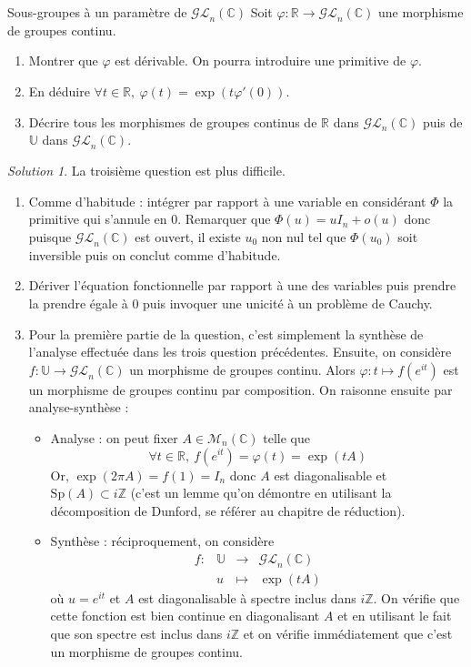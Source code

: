 \documentclass[french]{book}
\newcommand{\Z}{\mathbb{Z}}
\newcommand{\R}{\mathbb{R}}
\newcommand{\C}{\mathbb{C}}
\newcommand{\U}{\mathbb{U}}
\theoremstyle{definition}
\theoremstyle{remark}
\newtheorem*{sol}{Solution}
\begin{document}
\begin{exo}[2]{Sous-groupes à un paramètre de $\mathcal{GL}_n(\C)$}
	Soit $\varphi:\R\to\mathcal{GL}_n(\C)$ une morphisme de groupes continu.
	\begin{enumerate}
		\item Montrer que $\varphi$ est dérivable. On pourra introduire une primitive de $\varphi$.
		\item En déduire $\forall t\in\R,\ \varphi(t)=\exp(t\varphi'(0))$.
		\item Décrire tous les morphismes de groupes continus de $\R$ dans $\mathcal{GL}_n(\C)$ puis de $\U$ dans $\mathcal{GL}_n(\C)$.
	\end{enumerate}
\end{exo}
\begin{sol}
	La troisième question est plus difficile.
	\begin{enumerate}
		\item Comme d'habitude : intégrer par rapport à une variable en considérant $\Phi$ la primitive qui s'annule en $0$. Remarquer que $\Phi(u)=uI_n+o(u)$ donc puisque $\mathcal{GL}_n(\C)$ est ouvert, il existe $u_0$ non nul tel que $\Phi(u_0)$ soit inversible puis on conclut comme d'habitude.
		\item Dériver l'équation fonctionnelle par rapport à une des variables puis prendre la prendre égale à $0$ puis invoquer une unicité à un problème de Cauchy.
		\item Pour la première partie de la question, c'est simplement la synthèse de l'analyse effectuée dans les trois question précédentes. Ensuite, on considère $f:\U\to\mathcal{GL}_n(\C)$ un morphisme de groupes continu. Alors $\varphi:t\mapsto f(e^{it})$ est un morphisme de groupes continu par composition. On raisonne ensuite par analyse-synthèse :
		\begin{itemize}
			\item Analyse : on peut fixer $A\in\mathcal{M}_n(\C)$ telle que $$\forall t\in\R,\ f(e^{it})=\varphi(t)=\exp(tA)$$ Or, $\exp(2\pi A)=f(1)=I_n$ donc $A$ est diagonalisable et $\text{Sp}(A)\subset i\Z$ (c'est un lemme qu'on démontre en utilisant la décomposition de Dunford, se référer au chapitre de réduction).
			\item Synthèse : réciproquement, on considère $$\begin{array}{lrcl}
				f:&\U&\longrightarrow&\mathcal{GL}_n(\C)\\
				&u&\longmapsto&\exp(tA)
			\end{array}$$ où $u=e^{it}$ et $A$ est diagonalisable à spectre inclus dans $i\Z$. On vérifie que cette fonction est bien continue en diagonalisant $A$ et en utilisant le fait que son spectre est inclus dans $i\Z$ et on vérifie immédiatement que c'est un morphisme de groupes continu.
		\end{itemize}
	\end{enumerate}
\end{sol}
\end{document}
